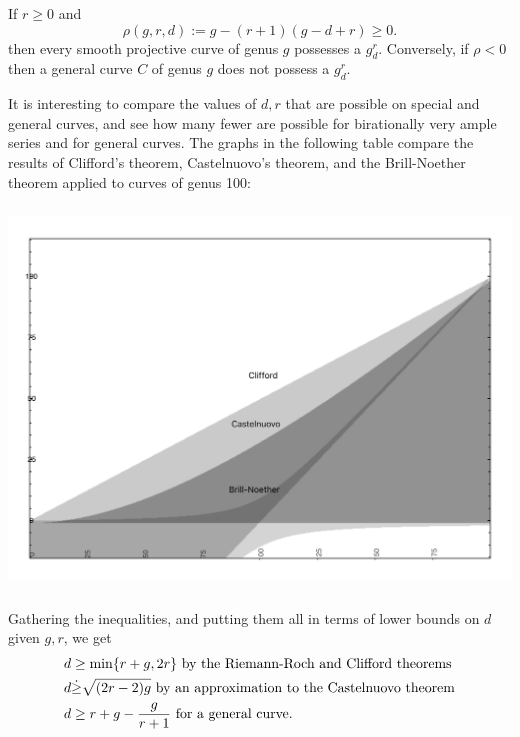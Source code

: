 \begin{theorem}\label{basic BN}
If $r\geq 0$ and
 $$
 \rho(g,r,d) := g - (r+1)(g-d+r) \geq 0.
$$
then every smooth projective curve of genus $g$  possesses a $g^r_d$. Conversely, if $\rho < 0$ then a general curve $C$ of genus $g$ does not possess a $g^r_d$.
\end{theorem}


It is interesting to compare the values of $d,r$ that are possible on special and general curves, and see how many fewer are possible for birationally very ample series and for general curves. The graphs in the following table compare the results of 
Clifford's theorem, Castelnuovo's theorem, and the Brill-Noether theorem applied to curves
of genus 100:

\centerline{ \includegraphics[height=4in]{"Clifford-Castelnuovo-Brill-Noether"}}

Gathering the inequalities, and putting them all in terms of lower bounds on $d$ given $g, r$,
we get \goodbreak
\begin{align*}
 d &\geq \min\{r+g, 2r\} \hbox{ by the Riemann-Roch and Clifford theorems}\\
 d &\dot\geq \sqrt{(2r-2)g} \hbox{ by an approximation to the Castelnuovo theorem}\\
 d &\geq r+g-\frac{g}{r+1} \hbox{ for a general curve.}
\end{align*}

